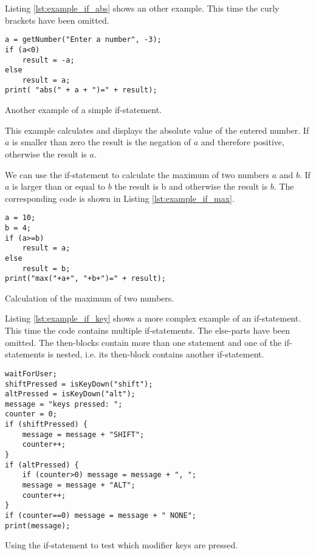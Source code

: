 Listing \ref{lst:example_if_abs} shows an other example. This time the curly brackets have been omitted.

\begin{listing}[H]
\begin{verbatim}
a = getNumber("Enter a number", -3);
if (a<0) 
	result = -a;
else 
	result = a;
print( "abs(" + a + ")=" + result); 
\end{verbatim}
\caption{Another example of a simple if-statement.}
\label{lst:example_if_abs}
\end{listing}

This example calculates and displays the absolute value of the entered number. If $a$ is smaller than zero the result is the negation of $a$ and therefore positive, otherwise the result is $a$.

We can use the if-statement to calculate the maximum of two numbers $a$ and $b$. If $a$ is larger than or equal to $b$ the result is b and otherwise the result is $b$. The corresponding code is shown in Listing \ref{lst:example_if_max}.

\begin{listing}[H]
\begin{verbatim}
a = 10;
b = 4;
if (a>=b) 
	result = a;
else 
	result = b;
print("max("+a+", "+b+")=" + result);
\end{verbatim}
\caption{Calculation of the maximum of two numbers.}
\label{lst:example_if_max}
\end{listing}

Listing \ref{lst:example_if_key} shows a more complex example of an if-statement. This time the code contains multiple if-statements. The else-parts have been omitted. The then-blocks contain more than one statement and one of the if-statements is nested, i.e. its then-block contains another if-statement.

\begin{listing}[H]
\begin{verbatim}
waitForUser;
shiftPressed = isKeyDown("shift");
altPressed = isKeyDown("alt");
message = "keys pressed: ";
counter = 0;
if (shiftPressed) {
	message = message + "SHIFT";
	counter++; 
}
if (altPressed) {	
	if (counter>0) message = message + ", ";
	message = message + "ALT";
	counter++; 
}
if (counter==0) message = message + " NONE";      
print(message);
\end{verbatim}
\caption{Using the if-statement to test which modifier keys are pressed.}
\label{lst:example_if_key}
\end{listing}


